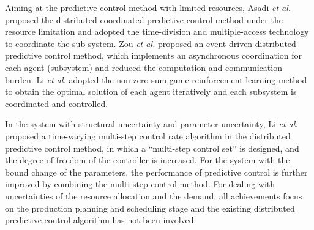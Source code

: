 \documentclass[conference,a4paper]{IEEEtran}
\begin{document}
Aiming at the predictive control method with limited resources, Asadi \emph{et al.} \cite{asadi} proposed the distributed coordinated predictive control method under the resource limitation and adopted the time-division and multiple-access technology to coordinate the sub-system. Zou \emph{et al.} \cite{zouyy} proposed an event-driven distributed predictive control method, which implements an asynchronous coordination for each agent (subsystem) and reduced the computation and communication burden. Li \emph{et al.} \cite{lijn} adopted the non-zero-sum game reinforcement learning method to obtain the optimal solution of each agent iteratively and each subsystem is coordinated and controlled.

In the system with structural uncertainty and parameter uncertainty, Li \emph{et al.} \cite{lidewei} proposed a time-varying multi-step control rate algorithm in the distributed predictive control method, in which a ``multi-step control set'' is designed, and the degree of freedom of the controller is increased. For the system with the bound change of the parameters, the performance of predictive control is further improved by combining the multi-step control method. For dealing with uncertainties of the resource allocation and the demand, all achievements focus on the production planning and scheduling stage and the existing distributed predictive control algorithm has not been involved.


\end{document}
